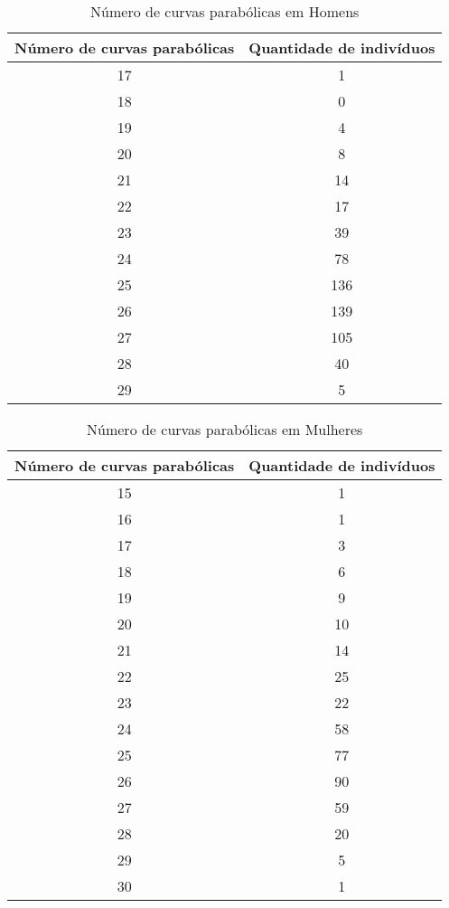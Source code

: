 \documentclass[a4paper,12pt]{article}
\begin{document}
\begin{table}[h!]
\centering
\caption{Número de curvas parabólicas em Homens}
\begin{tabular}{c c}
\hline
\textbf{Número de curvas parabólicas} & \textbf{Quantidade de indivíduos} \\ 
\hline
17 & 1   \\
18 & 0   \\
19 & 4   \\
20 & 8   \\
21 & 14  \\
22 & 17  \\
23 & 39  \\
24 & 78  \\
25 & 136 \\
26 & 139 \\
27 & 105 \\
28 & 40  \\
29 & 5   \\
\hline
\end{tabular}
\end{table}


\begin{table}[h!]
\centering
\caption{Número de curvas parabólicas em Mulheres}
\begin{tabular}{c c}
\hline
\textbf{Número de curvas parabólicas} & \textbf{Quantidade de indivíduos} \\ 
\hline
15 & 1  \\
16 & 1  \\
17 & 3  \\
18 & 6  \\
19 & 9  \\
20 & 10 \\
21 & 14 \\
22 & 25 \\
23 & 22 \\
24 & 58 \\
25 & 77 \\
26 & 90 \\
27 & 59 \\
28 & 20 \\
29 & 5  \\
30 & 1  \\
\hline
\end{tabular}
\end{table}
\end{document}
